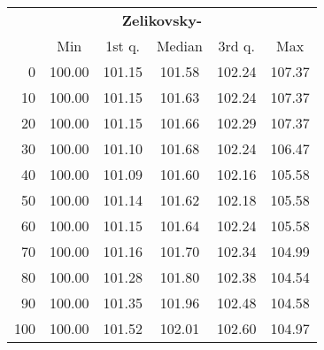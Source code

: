 \begin{tabular}{r|ccccc}
  \multicolumn{6}{c}{{\bf Zelikovsky-}} \\
  & Min & 1st q. & Median & 3rd q. & Max \\ \hline\hline
  0 & 100.00 & 101.15 & 101.58 & 102.24 & 107.37
\\ 10 & 100.00 & 101.15 & 101.63 & 102.24 & 107.37
\\ 20 & 100.00 & 101.15 & 101.66 & 102.29 & 107.37
\\ 30 & 100.00 & 101.10 & 101.68 & 102.24 & 106.47
\\ 40 & 100.00 & 101.09 & 101.60 & 102.16 & 105.58
\\ 50 & 100.00 & 101.14 & 101.62 & 102.18 & 105.58
\\ 60 & 100.00 & 101.15 & 101.64 & 102.24 & 105.58
\\ 70 & 100.00 & 101.16 & 101.70 & 102.34 & 104.99
\\ 80 & 100.00 & 101.28 & 101.80 & 102.38 & 104.54
\\ 90 & 100.00 & 101.35 & 101.96 & 102.48 & 104.58
\\ 100 & 100.00 & 101.52 & 102.01 & 102.60 & 104.97
\end{tabular}
